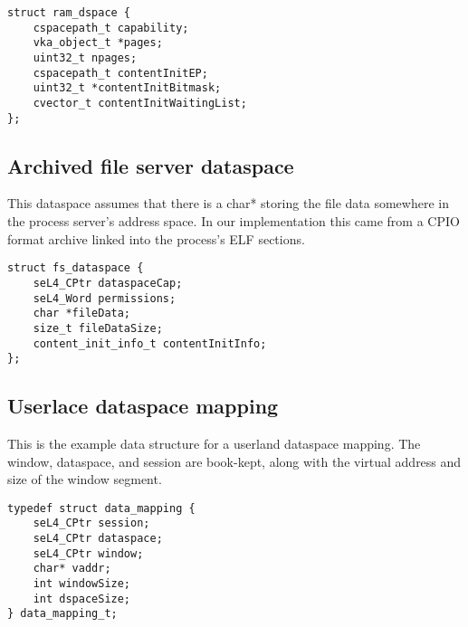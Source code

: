 \begin{verbatim}
struct ram_dspace {
    cspacepath_t capability;
    vka_object_t *pages;
    uint32_t npages;
    cspacepath_t contentInitEP;
    uint32_t *contentInitBitmask;
    cvector_t contentInitWaitingList;
};
\end{verbatim}

\subsection {Archived file server dataspace}

This dataspace assumes that there is a char* storing the file data somewhere in the process server's
address space. In our implementation this came from a CPIO format archive linked into the process's
ELF sections.

\begin{verbatim}
struct fs_dataspace {
    seL4_CPtr dataspaceCap;
    seL4_Word permissions;
    char *fileData;
    size_t fileDataSize;
    content_init_info_t contentInitInfo;
};
\end{verbatim}

\subsection {Userlace dataspace mapping}

This is the example data structure for a userland dataspace mapping. The window, dataspace, and
session are book-kept, along with the virtual address and size of the window segment.

\begin{verbatim}
typedef struct data_mapping {
    seL4_CPtr session;
    seL4_CPtr dataspace;
    seL4_CPtr window;
    char* vaddr;
    int windowSize;
    int dspaceSize;
} data_mapping_t;
\end{verbatim}
